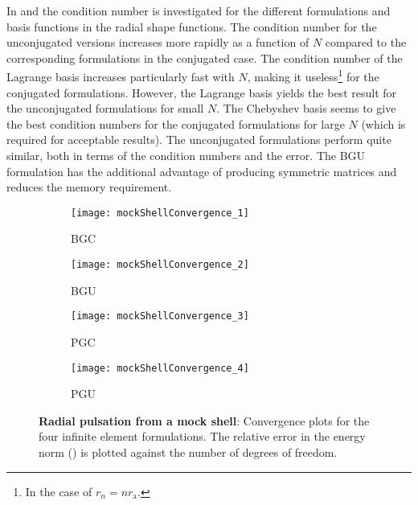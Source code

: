 In  and  the condition number is investigated for the different formulations and basis functions in the radial shape functions. The condition number for the unconjugated versions increases more rapidly as a function of $N$ compared to the corresponding formulations in the conjugated case. The condition number of the Lagrange basis increases particularly fast with $N$, making it useless\footnote{In the case of $r_n = nr_{\mathrm{a}}$.} for the conjugated formulations. However, the Lagrange basis yields the best result for the unconjugated formulations for small $N$. The Chebyshev basis seems to give the best condition numbers for the conjugated formulations for large $N$ (which is required for acceptable results). The unconjugated formulations perform quite similar, both in terms of the condition numbers and the error. The BGU formulation has the additional advantage of producing symmetric matrices and reduces the memory requirement. 
\begin{figure}
	\centering    
	\begin{subfigure}{0.49\textwidth}
		\centering
		\texttt{[image: mockShellConvergence\_1]}
	\caption{BGC}
	\end{subfigure}%
	\hspace*{0.02\textwidth}%
	\begin{subfigure}{0.49\textwidth}
		\centering
		\texttt{[image: mockShellConvergence\_2]}
		\caption{BGU}
	\end{subfigure}%
	\par\bigskip
	\par\bigskip
	\begin{subfigure}{0.49\textwidth}
		\centering
		\texttt{[image: mockShellConvergence\_3]}
		\caption{PGC}
	\end{subfigure}%
	\hspace*{0.02\textwidth}%
	\begin{subfigure}{0.49\textwidth}
		\centering
		\texttt{[image: mockShellConvergence\_4]}
		\caption{PGU}
	\end{subfigure}%
	\caption{\textbf{Radial pulsation from a mock shell}: Convergence plots for the four infinite element formulations. The relative error in the energy norm () is plotted against the number of degrees of freedom.}
	\label{Fig2:MS_convergence}
\end{figure}

